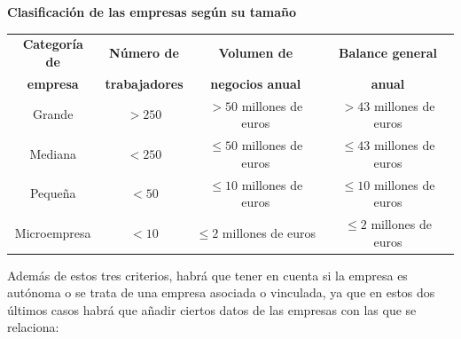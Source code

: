 \documentclass[12pt,a4paper,spanish]{report}
\begin{document}
				\begin{center}
					\textbf{Clasificación de las empresas según su tamaño}

						\begin{tabular}{|c | c | c | c|}
							\hline
							\rowcolor[rgb]{0.5,0.8,0.9}\textbf{Categoría de} & \textbf{Número de} & \textbf{Volumen de} & \textbf{Balance general} \\
							\rowcolor[rgb]{0.5,0.8,0.9}\textbf{empresa} & \textbf{trabajadores} & \textbf{negocios anual} & \textbf{anual} \\
							\hline
							Grande & $> 250$ & $> 50$ millones de euros & $> 43$ millones de euros \\
							\hline
							Mediana & $< 250$ & $\le 50$ millones de euros & $\le 43$ millones de euros \\
							\hline
							Pequeña & $< 50$ & $\le 10$ millones de euros & $\le 10$ millones de euros \\
							\hline
							Microempresa & $< 10$ & $\le 2$ millones de euros & $\le 2$ millones de euros \\
							\hline
						\end{tabular}
					\end{center}

				Además de estos tres criterios, habrá que tener en cuenta si la empresa es autónoma o se trata de una empresa asociada o vinculada, ya que en estos dos últimos casos habrá que añadir ciertos datos de las empresas con las que se relaciona:
\end{document}
